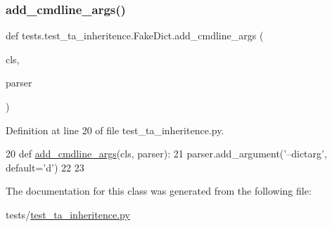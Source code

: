 \subsubsection{\texorpdfstring{add\+\_\+cmdline\+\_\+args()}{add\_cmdline\_args()}}
{\footnotesize\ttfamily def tests.\+test\+\_\+ta\+\_\+inheritence.\+Fake\+Dict.\+add\+\_\+cmdline\+\_\+args (\begin{DoxyParamCaption}\item[{}]{cls,  }\item[{}]{parser }\end{DoxyParamCaption})}



Definition at line 20 of file test\+\_\+ta\+\_\+inheritence.\+py.


\begin{DoxyCode}
20     \textcolor{keyword}{def }\hyperlink{namespaceparlai_1_1agents_1_1drqa_1_1config_a62fdd5554f1da6be0cba185271058320}{add\_cmdline\_args}(cls, parser):
21         parser.add\_argument(\textcolor{stringliteral}{'--dictarg'}, default=\textcolor{stringliteral}{'d'})
22 
23 
\end{DoxyCode}


The documentation for this class was generated from the following file\+:\begin{DoxyCompactItemize}
\item 
tests/\hyperlink{test__ta__inheritence_8py}{test\+\_\+ta\+\_\+inheritence.\+py}\end{DoxyCompactItemize}
